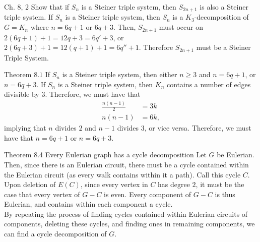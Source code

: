 \documentclass[10pt]{extarticle}
\begin{document}
  \begin{problem}{Ch. 8, 2}
    Show that if $S_n$ is a Steiner triple system, then $S_{2n+1}$ is also a Steiner triple system.
    \tcblower
    If $S_n$ is a Steiner triple system, then $S_n$ is a $K_3$-decomposition of $G = K_n$ where $n = 6q+1$ or $6q+3$. Then, $S_{2n+1}$ must occur on $2(6q+1) + 1 = 12q + 3 = 6q'+3$, or $2(6q+3) + 1 = 12(q+1) + 1 = 6q'' + 1$. Therefore $S_{2n+1}$ must be a Steiner Triple System.
  \end{problem}
  \begin{problem}{Theorem $8.1$}
    If $S_n$ is a Steiner triple system, then either $n\geq 3$ and $n = 6q + 1$, or $n = 6q + 3$.
    \tcblower
    If $S_n$ is a Steiner triple system, then $K_n$ contains a number of edges divisible by $3$. Therefore, we must have that
    \begin{align*}
      \frac{n(n-1)}{2} &= 3k\\
      n(n-1) &= 6k,
    \end{align*}
    implying that $n$ divides $2$ and $n-1$ divides $3$, or vice versa. Therefore, we must have that $n = 6q + 1$ or $n = 6q + 3$.
  \end{problem}
  \begin{problem}{Theorem 8.4}
    Every Eulerian graph has a cycle decomposition
    \tcblower
    Let $G$ be Eulerian. Then, since there is an Eulerian circuit, there must be a cycle contained within the Eulerian circuit (as every walk contains within it a path). Call this cycle $C$. \\

    Upon deletion of $E(C)$, since every vertex in $C$ has degree $2$, it must be the case that every vertex of $G - C$ is even. Every component of $G - C$ is thus Eulerian, and contains within each component a cycle.\\

    By repeating the process of finding cycles contained within Eulerian circuits of components, deleting these cycles, and finding ones in remaining components, we can find a cycle decomposition of $G$.
  \end{problem}
\end{document}
